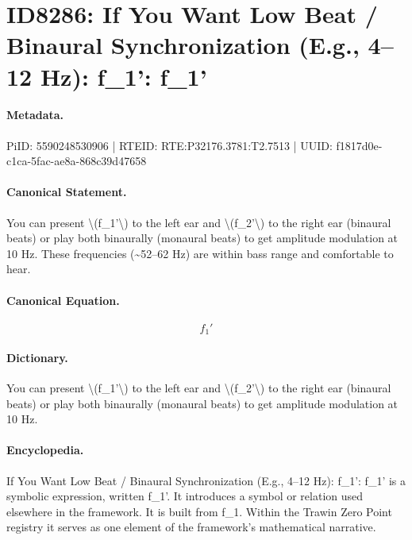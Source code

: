 \section*{ID8286: If You Want Low Beat / Binaural Synchronization (E.g., 4–12 Hz): f\_1': f\_1'}
\paragraph{Metadata.}
PiID: 5590248530906 | RTEID: RTE:P32176.3781:T2.7513 | UUID: f1817d0e-c1ca-5fac-ae8a-868c39d47658

\paragraph{Canonical Statement.}
You can present \textbackslash{}(f\_1'\textbackslash{}) to the left ear and \textbackslash{}(f\_2'\textbackslash{}) to the right ear (binaural beats) or play both binaurally (monaural beats) to get amplitude modulation at 10 Hz. These frequencies (\textasciitilde{}52–62 Hz) are within bass range and comfortable to hear.

\paragraph{Canonical Equation.}
\[
f_1'
\]

\paragraph{Dictionary.}
You can present \textbackslash{}(f\_1'\textbackslash{}) to the left ear and \textbackslash{}(f\_2'\textbackslash{}) to the right ear (binaural beats) or play both binaurally (monaural beats) to get amplitude modulation at 10 Hz.

\paragraph{Encyclopedia.}
If You Want Low Beat / Binaural Synchronization (E.g., 4–12 Hz): f\_1': f\_1' is a symbolic expression, written f\_1'. It introduces a symbol or relation used elsewhere in the framework. It is built from f\_1. Within the Trawin Zero Point registry it serves as one element of the framework's mathematical narrative.
